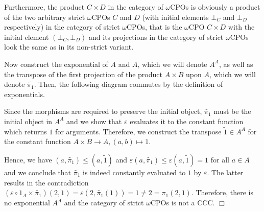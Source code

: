 Furthermore, the product $C × D$ in the category of $ω$CPOs is obviously a product of the two arbitrary strict $ω$CPOs $C$ and $D$ (with initial elements $\bot_C$ and $\bot_D$ respectively) in the category of strict $ω$CPOs, that is the $ω$CPO $C × D$ with the initial element $(\bot_C,\bot_D)$ and its projections in the category of strict $ω$CPOs look the same as in its non-strict variant.

Now construct the exponential of $A$ and $A$, which we will denote $A^A$, as well as the transpose of the first projection of the product $A × B$ upon $A$, which we will denote $\tilde{π_1}$. Then, the following diagram commutes by the definition of exponentials.


Since the morphisms are required to preserve the initial object, $\tilde{π_1}$ must be the initial object in $A^A$ and we show that $ε$ evaluates it to the constant function which returns $1$ for arguments. Therefore, we construct the transpose $\tilde{1} ∈ A^A$ for the constant function $A × B → A, (a,b) ↦ 1$.


Hence, we have $(a,\tilde{π_1}) ≤ (a,\tilde{1})$ and $ε(a,\tilde{π_1}) ≤ ε(a,\tilde{1}) = 1$ for all $a ∈ A$ and we conclude that $\tilde{π_1}$ is indeed constantly evaluated to $1$ by $ε$. The latter results in the contradiction $(ε ∘ 1_A × \tilde{π_1})(2,1) = ε(2,\tilde{π_1}(1)) = 1 ≠ 2 = π_1(2,1)$. Therefore, there is no exponential $A^A$ and the category of strict $ω$CPOs is not a CCC. \hfill $\Box$
